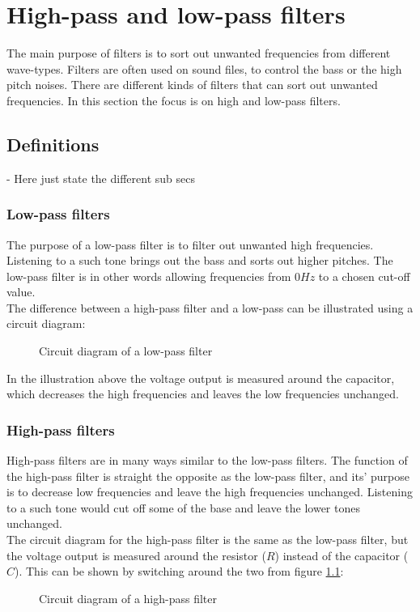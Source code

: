 \chapter{High-pass and low-pass filters}
The main purpose of filters is to sort out unwanted frequencies from different wave-types. Filters are often used on sound files, to control the bass or the high pitch noises. There are different kinds of filters that can sort out unwanted frequencies. In this section the focus is on high and low-pass filters.

\section{Definitions}
- Here just state the different sub secs
\subsection{Low-pass filters}
The purpose of a low-pass filter is to filter out unwanted high frequencies. Listening to a such tone brings out the bass and sorts out higher pitches. The low-pass filter is in other words allowing frequencies from $0Hz$ to a chosen cut-off value. \\
The difference between a high-pass filter and a low-pass can be illustrated using a circuit diagram:
\begin{figure}[H]
	
	\caption{Circuit diagram of a low-pass filter} \label{lp:diagram}
\end{figure} 
In the illustration above the voltage output is measured around the capacitor, which decreases the high frequencies and leaves the low frequencies unchanged.  
\subsection{High-pass filters}
High-pass filters are in many ways similar to the low-pass filters. The function of the high-pass filter is straight the opposite as the low-pass filter, and its' purpose is to decrease low frequencies and leave the high frequencies unchanged. Listening to a such tone would cut off some of the base and leave the lower tones unchanged. \\
The circuit diagram for the high-pass filter is the same as the low-pass filter, but the voltage output is measured around the resistor ($R$) instead of the capacitor ($C$). This can be shown by switching around the two from figure \ref{lp:diagram}:
\begin{figure}[H]
	
	\caption{Circuit diagram of a high-pass filter}
\end{figure} \label{hp:diagram}
